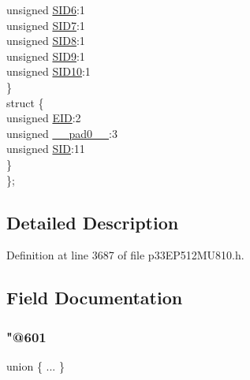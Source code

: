 \begin{DoxyCompactItemize}
\begin{tabbing}
\>\>unsigned \hyperlink{structtag_c1_r_x_f0_s_i_d_b_i_t_s_a70d70952133eb2389d5c326f9f0e8035}{SID6}:1\\
\>\>unsigned \hyperlink{structtag_c1_r_x_f0_s_i_d_b_i_t_s_a34097fb76decd431701fa2d86a22328e}{SID7}:1\\
\>\>unsigned \hyperlink{structtag_c1_r_x_f0_s_i_d_b_i_t_s_afe74894633244fdb0b0c01b4e8c522e7}{SID8}:1\\
\>\>unsigned \hyperlink{structtag_c1_r_x_f0_s_i_d_b_i_t_s_a33587704948067005c2a6a3ccc503c99}{SID9}:1\\
\>\>unsigned \hyperlink{structtag_c1_r_x_f0_s_i_d_b_i_t_s_a1a9084031c7f5fb16007feeebf0d8216}{SID10}:1\\
\>\} \\
\>struct \{\\
\>\>unsigned \hyperlink{structtag_c1_r_x_f0_s_i_d_b_i_t_s_ae80b378c9141f7c03e0b4e55b5f4b54d}{EID}:2\\
\>\>unsigned \hyperlink{structtag_c1_r_x_f0_s_i_d_b_i_t_s_adf71f3d8410c1f1dbbc96680a92c49af}{\_\_pad0\_\_}:3\\
\>\>unsigned \hyperlink{structtag_c1_r_x_f0_s_i_d_b_i_t_s_af88edf93b2fee2432665bd84f51287e4}{SID}:11\\
\>\} \\
\}; \\

\end{tabbing}\end{DoxyCompactItemize}


\subsection{Detailed Description}


Definition at line 3687 of file p33\+E\+P512\+M\+U810.\+h.



\subsection{Field Documentation}
\mbox{\label{structtag_c1_r_x_f0_s_i_d_b_i_t_s_a3cef98c46b04b3bac3de347e85119cb3}} 
\subsubsection{\texorpdfstring{"@601}{@601}}
{\footnotesize\ttfamily union \{ ... \} }

\mbox{\label{structtag_c1_r_x_f0_s_i_d_b_i_t_s_adf71f3d8410c1f1dbbc96680a92c49af}} 
